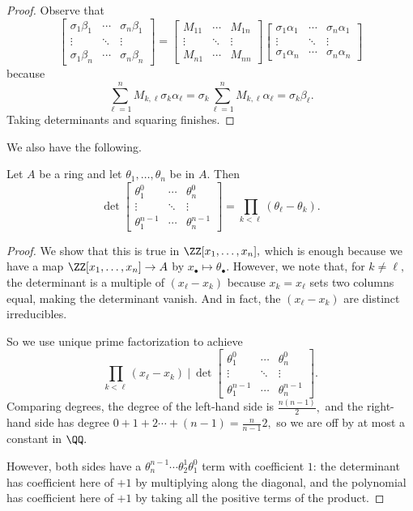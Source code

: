 \begin{proof}
    Observe that
    \[\begin{bmatrix}
        \sigma_1\beta_1 & \cdots & \sigma_n\beta_1 \\
        \vdots & \ddots & \vdots \\
        \sigma_1\beta_n & \cdots & \sigma_n\beta_n
    \end{bmatrix}=\begin{bmatrix}
        M_{11} & \cdots & M_{1n} \\
        \vdots & \ddots & \vdots \\
        M_{n1} & \cdots & M_{nn}
    \end{bmatrix}\begin{bmatrix}
        \sigma_1\alpha_1 & \cdots & \sigma_n\alpha_1 \\
        \vdots & \ddots & \vdots \\
        \sigma_1\alpha_n & \cdots & \sigma_n\alpha_n
    \end{bmatrix}\]
    because
    \[\sum_{\ell=1}^nM_{k,\ell}\sigma_k\alpha_\ell=\sigma_k\sum_{\ell=1}^nM_{k,\ell}\alpha_\ell=\sigma_k\beta_\ell.\]
    Taking determinants and squaring finishes.
\end{proof}
We also have the following.
\begin{lem}
    Let $A$ be a ring and let $\theta_1,\ldots,\theta_n$ be in $A.$ Then
    \[\det\begin{bmatrix}
        \theta_1^0 & \cdots & \theta_n^0 \\
        \vdots & \ddots & \vdots \\
        \theta_1^{n-1} & \cdots & \theta_n^{n-1}
    \end{bmatrix}=\prod_{k<\ell}(\theta_\ell-\theta_k).\]
\end{lem}
\begin{proof}
    We show that this is true in $\ZZ[x_1,\ldots,x_n],$ which is enough because we have a map $\ZZ[x_1,\ldots,x_n]\to A$ by $x_\bullet\mapsto\theta_\bullet.$ However, we note that, for $k\ne\ell,$ the determinant is a multiple of $(x_\ell-x_k)$ because $x_k=x_\ell$ sets two columns equal, making the determinant vanish. And in fact, the $(x_\ell-x_k)$ are distinct irreducibles.
    
    So we use unique prime factorization to achieve
    \[\prod_{k<\ell}(x_\ell-x_k)~\bigg|~\det\begin{bmatrix}
        \theta_1^0 & \cdots & \theta_n^0 \\
        \vdots & \ddots & \vdots \\
        \theta_1^{n-1} & \cdots & \theta_n^{n-1}
    \end{bmatrix}.\]
    Comparing degrees, the degree of the left-hand side is $\frac{n(n-1)}2,$ and the right-hand side has degree $0+1+2\cdots+(n-1)=\frac n{n-1}2,$ so we are off by at most a constant in $\QQ.$
    
    However, both sides have a $\theta_n^{n-1}\cdots\theta_2^1\theta_1^0$ term with coefficient $1$: the determinant has coefficient here of $+1$ by multiplying along the diagonal, and the polynomial has coefficient here of $+1$ by taking all the positive terms of the product.
\end{proof}
